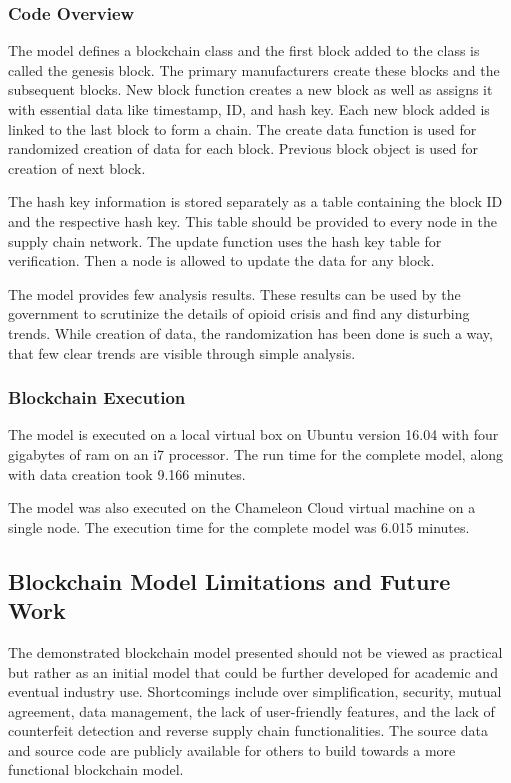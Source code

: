 \documentclass[sigconf]{acmart}
\begin{document}
\subsubsection{Code Overview} The model \cite{Kumar01} defines a blockchain class and the first block added to the class is called the genesis block. The primary manufacturers create these blocks and the subsequent blocks. New block function creates a new block as well as assigns it with essential data like timestamp, ID, and hash key. Each new block added is linked to the last block to form a chain. The create data function is used for randomized creation of data for each block. Previous block object is used for creation of next block. 

The hash key information is stored separately as a table containing the block ID and the respective hash key. This table should be provided to every node in the supply chain network. The update function uses the hash key table for verification. Then a node is allowed to update the data for any block. 

The model provides few analysis results. These results can be used by the government to scrutinize the details of opioid crisis and find any disturbing trends. While creation of data, the randomization has been done is such a way, that few clear trends are visible through simple analysis. 



\subsubsection{Blockchain Execution} The model is executed on a local virtual box on Ubuntu version 16.04 with four gigabytes of ram on an i7 processor. The run time for the complete model, along with data creation took 9.166 minutes. 

The model was also executed on the Chameleon Cloud virtual machine on a single node. The execution time for the complete model was 6.015 minutes.

\subsection{Blockchain Model Limitations and Future Work}
The demonstrated blockchain model presented should not be viewed as practical but rather as an initial model that could be further developed for academic and eventual industry use. Shortcomings include over simplification, security, mutual agreement, data management, the lack of user-friendly features, and the lack of counterfeit detection and reverse supply chain functionalities. The source data \cite{Kumar02} and source code \cite{Kumar01} are publicly available for others to build towards a more functional blockchain model.
\end{document}
